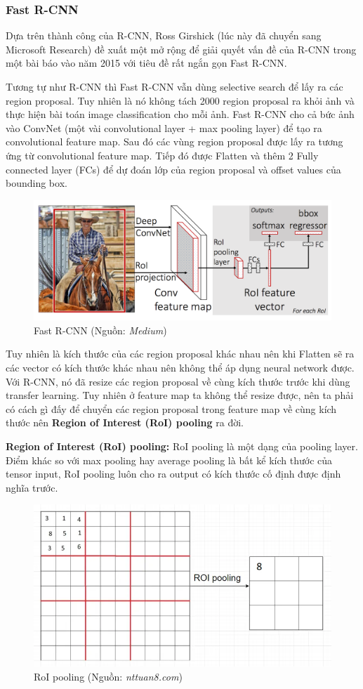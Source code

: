 \documentclass[a4paper, 12pt]{report}
\begin{document}
\subsubsection{Fast R-CNN}
Dựa trên thành công của R-CNN, Ross Girshick (lúc này đã chuyển sang Microsoft Research) đề xuất một mở rộng để giải quyết vấn đề của R-CNN trong một bài báo vào năm 2015 với tiêu đề rất ngắn gọn Fast R-CNN.\par
Tương tự như R-CNN thì Fast R-CNN vẫn dùng selective search để lấy ra các region proposal. Tuy nhiên là nó không tách 2000 region proposal ra khỏi ảnh và thực hiện bài toán image classification cho mỗi ảnh. Fast R-CNN cho cả bức ảnh vào ConvNet (một vài convolutional layer + max pooling layer) để tạo ra convolutional feature map. Sau đó các vùng region proposal được lấy ra tương ứng từ convolutional feature map. Tiếp đó được Flatten và thêm 2 Fully connected layer (FCs) để dự đoán lớp của region proposal và offset values của bounding box.\par
\begin{figure}[!h]
	\centering
	\includegraphics[width=0.7\linewidth]{Images/fastrcnn}
	\caption{Fast R-CNN (Nguồn: \textit{Medium})}
	\label{fig:fastrcnn}
\end{figure}
Tuy nhiên là kích thước của các region proposal khác nhau nên khi Flatten sẽ ra các vector có kích thước khác nhau nên không thể áp dụng neural network được. Với R-CNN, nó đã resize các region proposal về cùng kích thước trước khi dùng transfer learning. Tuy nhiên ở feature map ta không thể resize được, nên ta phải có cách gì đấy để chuyển các region proposal trong feature map về cùng kích thước nên \textbf{Region of Interest (RoI) pooling} ra đời.\par
\textbf{Region of Interest (RoI) pooling:} RoI pooling là một dạng của pooling layer. Điểm khác so với max pooling hay average pooling là bất kể kích thước của tensor input, RoI pooling luôn cho ra output có kích thước cố định được định nghĩa trước.\par
\begin{figure}[!h]
	\centering
	\includegraphics[width=0.7\linewidth]{Images/roi}
	\caption{RoI pooling (Nguồn: \textit{nttuan8.com})}
	\label{fig:roi}
\end{figure}
\end{document}
